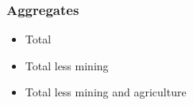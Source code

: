 \documentclass[
]{article}
\providecommand{\tightlist}{%
  \setlength{\itemsep}{0pt}\setlength{\parskip}{0pt}}
\begin{document}
\subsubsection{Aggregates}\label{aggregates}

\begin{itemize}
\tightlist
\item
  Total
\item
  Total less mining
\item
  Total less mining and agriculture
\end{itemize}
\end{document}
